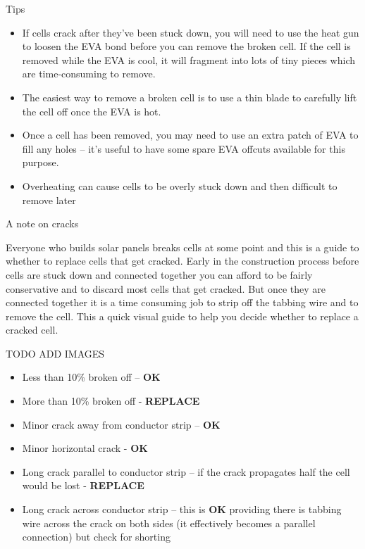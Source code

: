 \documentclass{article}
\theoremstyle{definition}
\theoremstyle{definition}
\theoremstyle{remark}
\begin{document}
    Tips

    \begin{itemize}
      \item If cells crack after they've been stuck down, you will need to use the heat gun to loosen the EVA bond before you can remove the broken cell. If the cell is removed while the EVA is cool, it will fragment into lots of tiny pieces which are time-consuming to remove. 
      \item The easiest way to remove a broken cell is to use a thin blade to carefully lift the cell off once the EVA is hot.  
      \item Once a cell has been removed, you may need to use an extra patch of EVA to fill any holes – it's useful to have some spare EVA offcuts available for this purpose.
      \item Overheating can cause cells to be overly stuck down and then difficult to remove later
    \end{itemize}

    A note on cracks

    Everyone who builds solar panels breaks cells at some point and this is a guide to whether to replace cells that get cracked. Early in the construction process before cells are stuck down and connected together you can afford to be fairly conservative and to discard most cells that get cracked. But once they are connected together it is a time consuming job to strip off the tabbing wire and to remove the cell. This a quick visual guide to help you decide whether to replace a cracked cell.

    TODO ADD IMAGES

    \begin{itemize}
      \item Less than 10\% broken off – \textbf{OK}
      \item More than 10\% broken off - \textbf{REPLACE}
      \item Minor crack away from conductor strip – \textbf{OK}
      \item Minor horizontal crack - \textbf{OK}
      \item Long crack parallel to conductor strip – if the crack propagates half the cell would be lost - \textbf{REPLACE}
      \item Long crack across conductor strip – this is \textbf{OK} providing there is tabbing wire across the crack on both sides (it effectively becomes a parallel connection) but check for shorting
    \end{itemize}
\end{document}
